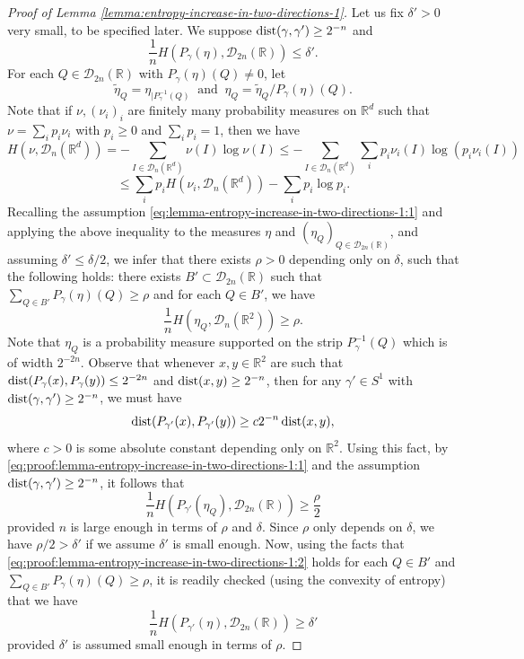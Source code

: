 \documentclass[a4paper,11pt]{amsart}
\theoremstyle{definition}
\numberwithin{equation}{section}
\def\D{\mathcal{D}}
\def\R{\mathbb R}
\DeclareMathOperator{\dist}{{\rm dist}}
\begin{document}
\begin{proof}[Proof of Lemma \ref{lemma:entropy-increase-in-two-directions-1}]
Let us fix $\delta'>0$ very small, to be specified later.
We suppose $\dist(\gamma,\gamma')\ge 2^{-n}$ and 
\[
\frac{1}{n}H(P_\gamma(\eta),\D_{2n}(\R))\le \delta'.
\]
For each $Q\in \D_{2n}(\R)$ with $P_{\gamma}(\eta)(Q)\neq 0$, let 
\[
\tilde{\eta}_Q=\eta_{|P_{\gamma}^{-1}(Q)} \ \textrm{ and } \ \eta_Q=\tilde{\eta}_Q/P_\gamma(\eta)(Q). 
\]
Note that if $\nu,(\nu_i)_i$ are finitely many probability measures on $\R^d$ such that $\nu=\sum_ip_i\nu_i$ with $p_i\ge 0$ and $\sum_ip_i=1$, then we have 
\begin{equation*}\label{eq:proof:lemma-entropy-increase-in-two-directions-1:0}
H(\nu,\D_n(\R^d))=-\sum_{I\in \D_n(\R^d)}\nu(I)\log\nu(I)\le -\sum_{I\in \D_n(\R^d)}\sum_{i}p_i\nu_i(I)\log (p_i\nu_i(I))
\end{equation*}
\begin{equation*}
\le \sum_{i}p_iH(\nu_i,\D_n(\R^d))-\sum_ip_i\log p_i.
\end{equation*}
Recalling  the assumption \eqref{eq:lemma-entropy-increase-in-two-directions-1:1} and applying the above inequality to the measures $\eta$ and $(\eta_Q)_{Q\in \D_{2n}(\R)}$, and assuming $\delta'\le \delta/2$, we infer that there exists $\rho>0$ depending only on $\delta$, such that the following holds: there exists $B'\subset \D_{2n}(\R)$ such that $\sum_{Q\in B'}P_{\gamma}(\eta)(Q)\ge \rho$ and for each $Q\in B'$, we have 
\begin{equation}\label{eq:proof:lemma-entropy-increase-in-two-directions-1:1}
\frac{1}{n}H(\eta_Q,\D_n(\R^2))\ge \rho.
\end{equation}
Note that $\eta_Q$ is a probability measure supported on the strip $P_{\gamma}^{-1}(Q)$ which is of width $2^{-2n}$. Observe that whenever $x,y\in \R^2$ are such that $\dist(P_\gamma(x),P_\gamma(y))\le 2^{-2n}$ and $\dist(x,y)\ge 2^{-n}$, then for any $\gamma'\in S^1$ with $\dist(\gamma,\gamma')\ge 2^{-n}$, we must have
\[
\dist(P_{\gamma'}(x),P_{\gamma'}(y))\ge c2^{-n}\dist(x,y),
\] 
where $c>0$ is some absolute constant depending only on $\R^2$.  Using this fact,  by \eqref{eq:proof:lemma-entropy-increase-in-two-directions-1:1} and the assumption $\dist(\gamma,\gamma')\ge 2^{-n}$,  it follows that 
\begin{equation}\label{eq:proof:lemma-entropy-increase-in-two-directions-1:2}
\frac{1}{n}H(P_{\gamma'}(\eta_Q),\D_{2n}(\R))\ge \frac{\rho}{2}
\end{equation}
provided $n$ is large enough in terms of  $\rho$ and $\delta$. 
Since $\rho$ only depends on $\delta$, we have $\rho/2>\delta' $ if we assume $\delta'$ is small enough. 
Now,  using the facts that \eqref{eq:proof:lemma-entropy-increase-in-two-directions-1:2} holds for each $Q\in B'$ and  $\sum_{Q\in B'}P_{\gamma}(\eta)(Q)\ge \rho$, it is readily checked (using the convexity of entropy) that we have
\[
\frac{1}{n}H(P_{\gamma'}(\eta),\D_{2n}(\R))\ge \delta'
\]
provided $\delta'$ is assumed small enough in terms of  $\rho$.
\end{proof}
\fi
\end{document}
